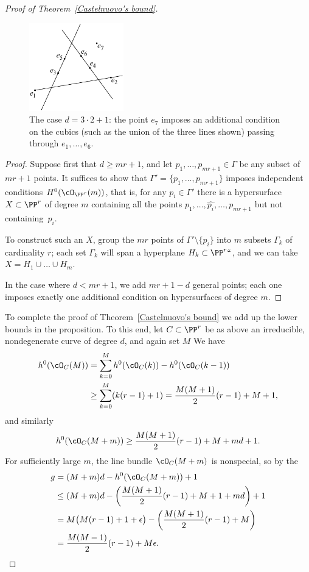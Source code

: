 \begin{proof}[Proof of Theorem~\ref{Castelnuovo's bound}]
\begin{figure}
\centerline {\includegraphics[height=1.5in]{"main/Fig09-3"}}
\caption{The case $d = 3\cdot 2+1$: the point $e_{7}$ imposes an additional
condition on the cubics (such as the union of the three lines shown)
passing through
$e_{1},\dots, e_{6}$.}
\label{Fig9.3}
\end{figure}

\begin{proof}
Suppose first that $d \geq mr+1$, and let $p_1,\dots,p_{mr+1} \in
\Gamma$ be any subset of $mr+1$ points. It suffices to show that
$\Gamma' = \{p_1,\dots,p_{mr+1}\}$ imposes independent conditions 
$H^0(\cO_{\PP^r}(m))$, that is, for any $p_i \in \Gamma'$ there is a
hypersurface $X \subset \PP^r$ of degree $m$ containing all the points
$p_1,\dots, \hat{p_i},\dots,p_{mr+1}$ but not containing~$p_i$.

To construct such an $X$, group the $mr$ points of $\Gamma' \setminus
\{p_i\}$ into $m$ subsets $\Gamma_k$ of cardinality $r$; each set
$\Gamma_k$ will span a hyperplane $H_k \subset \PP^r` `$, and we can
take $X = H_1 \cup \dots \cup H_m$.

In the case where $d<mr+1$, we add $mr+1-d$ general points; each one
imposes exactly one
additional condition on hypersurfaces of degree $m$.
\end{proof}


To complete the proof of Theorem~\ref{Castelnuovo's bound} we add up the
lower bounds in the proposition. To this end, let $C \subset \PP^r$ be
as above an irreducible, nondegenerate curve of degree $d$, and again set
$M$
We have
\begin{align*}
h^0(\cO_C(M)) &= \sum_{k=0}^M h^0(\cO_C(k)) - h^0(\cO_C(k-1)) \\
&\geq  \sum_{k=0}^M (k(r-1)+1) 
= \frac{M(M+1)}{2}(r-1) + M + 1
,
\end{align*}
and similarly
$$
h^0(\cO_C(M+m)) \geq \frac{M(M+1)}{2}(r-1) + M  + md+ 1
.
$$
For sufficiently large $m$, the line bundle $\cO_C(M+m)$ is nonspecial,
so by the 
%
\begin{align*}
g &= (M+m)d - h^0(\cO_C(M+m)) + 1 \\
&\leq (M+m)d - \left(  \frac{M(M+1)}{2}(r-1) + M + 1 + md \right)+1 \\
& = M\bigl( M(r-1) + 1 + \epsilon \bigr) - \left(  \frac{M(M+1)}{2}(r-1)
+ M  \right) \\
&= \frac{M(M-1)}{2}(r-1) + M\epsilon.
\end{align*}



\end{proof}
